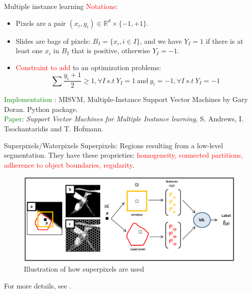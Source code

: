 \documentclass{beamer}
\begin{document}
\begin{frame}[noframenumbering]{Multiple instance learning}
\textcolor{red}{Notations}:
\begin{itemize}
\item Pixels are a pair $(x_i,y_i) \in \mathbb{R}^d \times \lbrace -1, +1\rbrace$.
\item Slides are bags of pixels: $B_I=\lbrace x_i, i\in I \rbrace$, and we have $Y_I=1$ if there is at least one $x_i$ in $B_I$ that is positive, otherwise $Y_I=-1$. 
\item \textcolor{red}{Constraint to add} to an optimization problems: \\
$$\sum \frac{y_i+1}{2} \geqslant 1, \forall I \ s.t \ Y_I=1 \ \text{and} \ y_i=-1, \forall I \ s.t \ Y_I=-1$$
\end{itemize}
\textcolor{green}{Implementation} : MISVM, Multiple-Instance Support Vector Machines by Gary Doran. Python package. \\
\textcolor{green}{Paper}: \textit{Support Vector Machines for Multiple Instance learning}, S. Andrews, I. Tsochantaridis and T. Hofmann.
\end{frame}


\begin{frame}[noframenumbering]{Superpixels/Waterpixels}
Superpixels: Regions resulting from a low-level segmentation. 
They have these proprieties: \textcolor{red}{homogeneity, connected partitions, adherence to object boundaries, regularity}.
\begin{figure}[!ht]
\centering
\includegraphics[width=\textwidth]{Waterpixels.png}
\caption{Illustration of how superpixels are used}
\label{}
\end{figure}
\begin{small}
For more details, see \cite{waterpixel}.
\end{small}
\end{frame}
\end{document}
